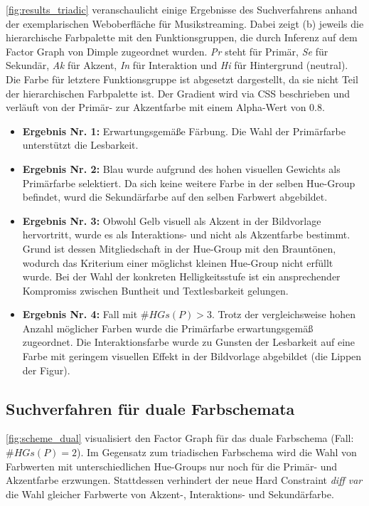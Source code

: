 \autoref{fig:results_triadic} veranschaulicht einige Ergebnisse des Suchverfahrens anhand der exemplarischen Weboberfläche für Musikstreaming. Dabei zeigt (b) jeweils die hierarchische Farbpalette mit den Funktionsgruppen, die durch Inferenz auf dem Factor Graph von Dimple zugeordnet wurden. \emph{Pr} steht für Primär, \emph{Se} für Sekundär, \emph{Ak} für Akzent, \emph{In} für Interaktion und \emph{Hi} für Hintergrund (neutral). Die Farbe für letztere Funktionsgruppe ist abgesetzt dargestellt, da sie nicht Teil der hierarchischen Farbpalette ist. Der Gradient wird via CSS beschrieben und verläuft von der Primär- zur Akzentfarbe mit einem Alpha-Wert von 0.8.

\begin{itemize}
	\item \textbf{Ergebnis Nr. 1:} Erwartungsgemäße Färbung. Die Wahl der Primärfarbe unterstützt die Lesbarkeit.
	\item \textbf{Ergebnis Nr. 2:} Blau wurde aufgrund des hohen visuellen Gewichts als Primärfarbe selektiert. Da sich keine weitere Farbe in der selben Hue-Group befindet, wurd die Sekundärfarbe auf den selben Farbwert abgebildet.
	 \item \textbf{Ergebnis Nr. 3:} Obwohl Gelb visuell als Akzent in der Bildvorlage hervortritt, wurde es als Interaktions- und nicht als Akzentfarbe bestimmt. Grund ist dessen Mitgliedschaft in der Hue-Group mit den Brauntönen, wodurch das Kriterium einer möglichst kleinen Hue-Group nicht erfüllt wurde. Bei der Wahl der konkreten Helligkeitsstufe ist ein ansprechender Kompromiss zwischen Buntheit und Textlesbarkeit gelungen.
	 \item \textbf{Ergebnis Nr. 4:} Fall mit $\#HGs(P) > 3$. Trotz der vergleichsweise hohen Anzahl möglicher Farben wurde die Primärfarbe erwartungsgemäß zugeordnet. Die Interaktionsfarbe wurde zu Gunsten der Lesbarkeit auf eine Farbe mit geringem visuellen Effekt in der Bildvorlage abgebildet (die Lippen der Figur).
\end{itemize}

\subsection{Suchverfahren für duale Farbschemata}

\autoref{fig:scheme_dual} visualisiert den Factor Graph für das duale Farbschema (Fall: $\#HGs(P) = 2$). Im Gegensatz zum triadischen Farbschema wird die Wahl von Farbwerten mit unterschiedlichen Hue-Groups nur noch für die Primär- und Akzentfarbe erzwungen. Stattdessen verhindert der neue Hard Constraint \emph{diff var} die Wahl gleicher Farbwerte von Akzent-, Interaktions- und Sekundärfarbe.

